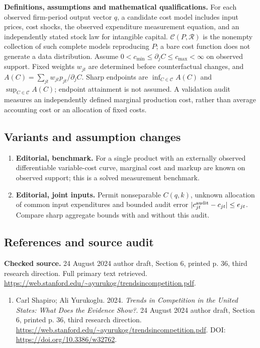 \documentclass[11pt,a4paper]{article}
\begin{document}
\textbf{Definitions, assumptions and mathematical qualifications.} For each observed firm-period output vector \(q\), a candidate cost model includes input prices, cost shocks, the observed expenditure measurement equation, and an independently stated stock law for intangible capital. \(\mathcal C(P,\mathcal R)\) is the nonempty collection of such complete models reproducing \(P\); a bare cost function does not generate a data distribution. Assume \(0<c_{\min}\leq\partial_j C\leq c_{\max}<\infty\) on observed support. Fixed weights \(w_{jt}\) are determined before counterfactual changes, and \(A(C)=\sum_{jt}w_{jt}p_{jt}/\partial_jC\). Sharp endpoints are \(\inf_{C\in\mathcal C}A(C)\) and \(\sup_{C\in\mathcal C}A(C)\); endpoint attainment is not assumed. A validation audit measures an independently defined marginal production cost, rather than average accounting cost or an allocation of fixed costs.
\subsection*{Variants and assumption changes}
\begin{enumerate}
\item \textbf{Editorial, benchmark.} For a single product with an externally observed differentiable variable-cost curve, marginal cost and markup are known on observed support; this is a solved measurement benchmark.
\item \textbf{Editorial, joint inputs.} Permit nonseparable \(C(q,k)\), unknown allocation of common input expenditures and bounded audit error \(|c^{\rm audit}_{jt}-c_{jt}|\leq e_{jt}\). Compare sharp aggregate bounds with and without this audit.
\end{enumerate}
\subsection*{References and source audit}
\textbf{Checked source.} 24 August 2024 author draft, Section 6, printed p. 36, third research direction. Full primary text retrieved. \url{https://web.stanford.edu/~ayurukog/trendsincompetition.pdf}.
\begin{enumerate}\raggedright
\item\hypertarget{definitions:source:30007673:1}{} Carl Shapiro; Ali Yurukoglu. 2024. \emph{Trends in Competition in the United States: What Does the Evidence Show?}. 24 August 2024 author draft, Section 6, printed p. 36, third research direction.
\url{https://web.stanford.edu/~ayurukog/trendsincompetition.pdf}.
DOI: \url{https://doi.org/10.3386/w32762}.
\end{enumerate}
\end{document}
